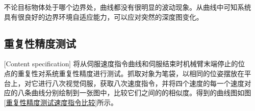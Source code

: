 \documentclass[fontset=fandol,type=bachelor,campus=harbin,bsmainpagenumberline=true]{hithesisbook}
\begin{document}
不论目标物体处于哪个边界处，曲线都没有很明显的波动现象。从曲线中可知系统具有很良好的边界环境自适应能力，可以应对突然的深度图变化。

\subsection{重复性精度测试}[Content specification]
将从伺服速度指令曲线和伺服结束时机械臂末端停止的位点的重复性对系统重复性精度进行测试。抓取对象为笔袋，以相同的位姿摆放在平台上，对它进行八次视觉伺服，获取八次速度指令，并将四个速度的每一个速度对应的八条曲线分别绘制到一张图中，比较它们之间的的相似度。得到的曲线图如图\ref{重复性精度测试速度指令比较}所示。
\newpage
\begin{figure}[h]
	\centering
\end{figure}
\end{document}
